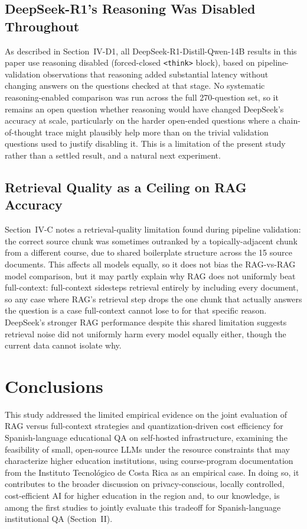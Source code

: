 \documentclass[conference]{IEEEtran}
\begin{document}
\subsection{DeepSeek-R1's Reasoning Was Disabled Throughout}

As described in Section~IV-D1, all DeepSeek-R1-Distill-Qwen-14B results in this paper use reasoning disabled (forced-closed \texttt{<think>} block), based on pipeline-validation observations that reasoning added substantial latency without changing answers on the questions checked at that stage.
No systematic reasoning-enabled comparison was run across the full 270-question set, so it remains an open question whether reasoning would have changed DeepSeek's accuracy at scale, particularly on the harder open-ended questions where a chain-of-thought trace might plausibly help more than on the trivial validation questions used to justify disabling it.
This is a limitation of the present study rather than a settled result, and a natural next experiment.

\subsection{Retrieval Quality as a Ceiling on RAG Accuracy}

Section~IV-C notes a retrieval-quality limitation found during pipeline validation: the correct source chunk was sometimes outranked by a topically-adjacent chunk from a different course, due to shared boilerplate structure across the 15 source documents.
This affects all models equally, so it does not bias the RAG-vs-RAG model comparison, but it may partly explain why RAG does not uniformly beat full-context: full-context sidesteps retrieval entirely by including every document, so any case where RAG's retrieval step drops the one chunk that actually answers the question is a case full-context cannot lose to for that specific reason.
DeepSeek's stronger RAG performance despite this shared limitation suggests retrieval noise did not uniformly harm every model equally either, though the current data cannot isolate why.

\section{Conclusions}

This study addressed the limited empirical evidence on the joint evaluation of \gls{RAG} versus full-context strategies and quantization-driven cost efficiency for Spanish-language educational \gls{QA} on self-hosted infrastructure, examining the feasibility of small, open-source \glspl{LLM} under the resource constraints that may characterize higher education institutions, using course-program documentation from the Instituto Tecnol\'ogico de Costa Rica as an empirical case.
In doing so, it contributes to the broader discussion on privacy-conscious, locally controlled, cost-efficient \gls{AI} for higher education in the region and, to our knowledge, is among the first studies to jointly evaluate this tradeoff for Spanish-language institutional \gls{QA} (Section~II).
\end{document}
